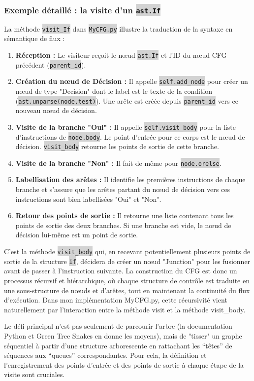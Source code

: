 \documentclass[11pt,a4paper]{article}
\newcommand{\code}[1]{\colorbox{lightgray}{\texttt{\small #1}}}
\begin{document}
\subsubsection{Exemple détaillé : la visite d'un \code{ast.If}}

La méthode \code{visit\_If} dans \code{MyCFG.py} illustre la traduction de la syntaxe en sémantique de flux :
\begin{enumerate}
    \item \textbf{Réception :} Le visiteur reçoit le nœud \code{ast.If} et l'ID du nœud CFG précédent (\code{parent\_id}).
    \item \textbf{Création du nœud de Décision :} Il appelle \code{self.add\_node} pour créer un nœud de type "Decision" dont le label est le texte de la condition (\code{ast.unparse(node.test)}). Une arête est créée depuis \code{parent\_id} vers ce nouveau nœud de décision.
    \item \textbf{Visite de la branche "Oui" :} Il appelle \code{self.visit\_body} pour la liste d'instructions de \code{node.body}. Le point d'entrée pour ce corps est le nœud de décision. \code{visit\_body} retourne les points de sortie de cette branche.
    \item \textbf{Visite de la branche "Non" :} Il fait de même pour \code{node.orelse}.
    \item \textbf{Labellisation des arêtes :} Il identifie les premières instructions de chaque branche et s'assure que les arêtes partant du nœud de décision vers ces instructions sont bien labellisées "Oui" et "Non".
    \item \textbf{Retour des points de sortie :} Il retourne une liste contenant tous les points de sortie des deux branches. Si une branche est vide, le nœud de décision lui-même est un point de sortie.
\end{enumerate}
C'est la méthode \code{visit\_body} qui, en recevant potentiellement plusieurs points de sortie de la structure \code{if}, décidera de créer un nœud "Junction" pour les fusionner avant de passer à l'instruction suivante.
La construction du CFG est donc un processus récursif et hiérarchique, où chaque structure de contrôle est traduite en une sous-structure de nœuds et d'arêtes, tout en maintenant la continuité du flux d'exécution. 
Dans mon implémentation MyCFG.py, cette récursivité vient naturellement par l'interaction entre la méthode visit et la méthode visit_body.

Le défi principal n'est pas seulement de parcourir l'arbre (la documentation Python et Green Tree Snakes en donne les moyens), mais de "tisser" un graphe séquentiel à partir d'une structure arborescente en rattachant les ``têtes'' de séquences aux ``queues'' correspondantes.
Pour cela, la définition et l'enregistrement des points d'entrée et des points de sortie à chaque étape de la visite sont cruciales.
\end{document}
